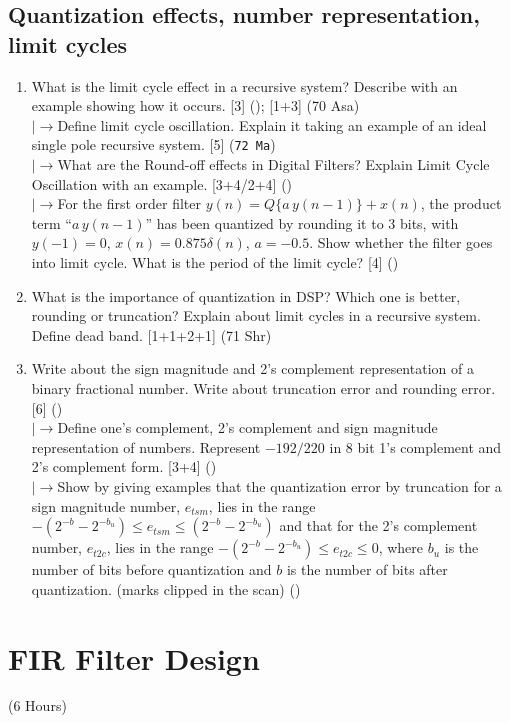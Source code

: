 \documentclass[12pt]{article}
\newcommand{\lb}{\\$\left|\rightarrow\right.$}
\begin{document}
  \subsection{Quantization effects, number representation, limit cycles}
    \begin{enumerate}[topsep=0pt, noitemsep]
      \item What is the limit cycle effect in a recursive system? Describe with an example showing how it occurs. \hfill [3] (); [1+3] (70 Asa)
        \lb Define limit cycle oscillation. Explain it taking an example of an ideal single pole recursive system. \hfill [5] (\texttt{72 Ma})
        \lb What are the Round-off effects in Digital Filters? Explain Limit Cycle Oscillation with an example. \hfill [3+4/2+4] ()
        \lb For the first order filter $y(n)=Q\{a\,y(n-1)\}+x(n)$, the product term ``$a\,y(n-1)$'' has been quantized by rounding it to 3 bits, with $y(-1)=0$, $x(n)=0.875\delta(n)$, $a=-0.5$. Show whether the filter goes into limit cycle. What is the period of the limit cycle? \hfill [4] ()
      \item What is the importance of quantization in DSP? Which one is better, rounding or truncation? Explain about limit cycles in a recursive system. Define dead band. \hfill [1+1+2+1] (71 Shr)
      \item Write about the sign magnitude and 2's complement representation of a binary fractional number. Write about truncation error and rounding error. \hfill [6] ()
        \lb Define one's complement, 2's complement and sign magnitude representation of numbers. Represent $-192/220$ in 8 bit 1's complement and 2's complement form. \hfill [3+4] ()
        \lb Show by giving examples that the quantization error by truncation for a sign magnitude number, $e_{tsm}$, lies in the range $-(2^{-b}-2^{-b_u})\le e_{tsm}\le(2^{-b}-2^{-b_u})$ and that for the 2's complement number, $e_{t2c}$, lies in the range $-(2^{-b}-2^{-b_u})\le e_{t2c}\le0$, where $b_u$ is the number of bits before quantization and $b$ is the number of bits after quantization. \hfill (marks clipped in the scan) ()
    \end{enumerate}

\pagebreak
\section{FIR Filter Design}
\begin{center}(6 Hours)\end{center}
\end{document}
